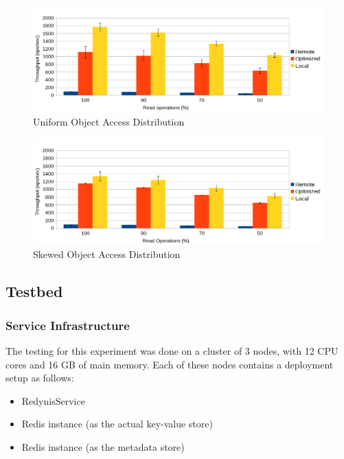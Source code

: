 \documentclass{sig-alternate}
\begin{document}
\begin{figure}[ht]
\centering
\includegraphics[scale=0.60]{images/Uniform-dist-throughput.png}
\caption{Uniform Object Access Distribution}
\label{fig:res-unif}
\end{figure}

\begin{figure}[ht]
\centering
\includegraphics[scale=0.60]{images/Skewed-dist-throughput.png}
\caption{Skewed Object Access Distribution}
\label{fig:res-skew}
\end{figure}

\subsection{Testbed}

\subsubsection{Service Infrastructure} \label{Service-Infrastructure}
The testing for this experiment was done on a cluster of 3 nodes, with 12 CPU cores and 16 GB of main memory.
Each of these nodes contains a deployment setup as follows:
\begin{itemize}
	\item RedynisService \cite{redynis-svc}
	\item Redis instance (as the actual key-value store)
	\item Redis instance (as the metadata store)
\end{itemize}
\end{document}
